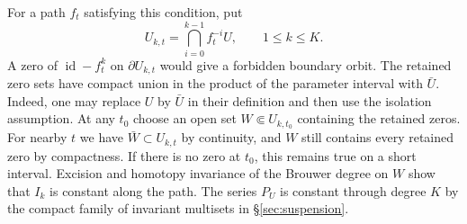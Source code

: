 For a path $f_t$ satisfying this condition, put
\[
 U_{k,t}=\bigcap_{i=0}^{k-1}f_t^{-i}U,\qquad 1\le k\le K .
\]
A zero of $\operatorname{id}-f_t^k$ on $\partial U_{k,t}$ would give
a forbidden boundary orbit. The retained zero sets have compact
union in the product of the parameter interval with $\bar U$.
Indeed, one may replace $U$ by $\bar U$ in their definition and
then use the isolation assumption. At any $t_0$ choose an open
set $W\Subset U_{k,t_0}$ containing the retained zeros. For nearby
$t$ we have $\bar W\subset U_{k,t}$ by continuity, and $W$ still
contains every retained zero by compactness. If there is no zero at
$t_0$, this remains true on a short interval. Excision and homotopy
invariance of the Brouwer degree on $W$ show that $I_k$ is constant
along the path. The series $P_U$ is constant through degree $K$ by
the compact family of invariant multisets in
\S\ref{sec:suspension}.

